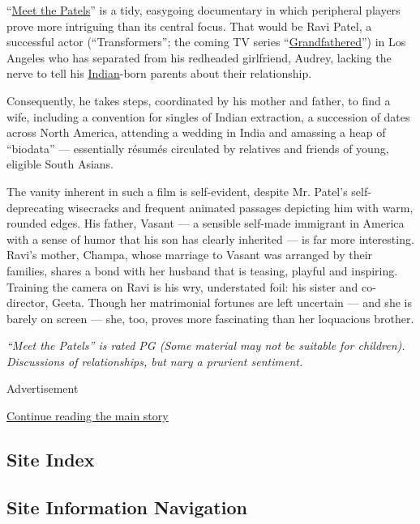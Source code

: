 ``\href{http://www.meetthepatelsfilm.com/}{Meet the Patels}'' is a tidy,
easygoing documentary in which peripheral players prove more intriguing
than its central focus. That would be Ravi Patel, a successful actor
(``Transformers''; the coming TV series
``\href{https://www.youtube.com/watch?v=1V7u8Jdo63A}{Grandfathered}'')
in Los Angeles who has separated from his redheaded girlfriend, Audrey,
lacking the nerve to tell his
\href{http://www.gujaratindia.com/}{Indian}-born parents about their
relationship.

Consequently, he takes steps, coordinated by his mother and father, to
find a wife, including a convention for singles of Indian extraction, a
succession of dates across North America, attending a wedding in India
and amassing a heap of ``biodata'' --- essentially résumés circulated by
relatives and friends of young, eligible South Asians.

The vanity inherent in such a film is self-evident, despite Mr. Patel's
self-deprecating wisecracks and frequent animated passages depicting him
with warm, rounded edges. His father, Vasant --- a sensible self-made
immigrant in America with a sense of humor that his son has clearly
inherited --- is far more interesting. Ravi's mother, Champa, whose
marriage to Vasant was arranged by their families, shares a bond with
her husband that is teasing, playful and inspiring. Training the camera
on Ravi is his wry, understated foil: his sister and co-director, Geeta.
Though her matrimonial fortunes are left uncertain --- and she is barely
on screen --- she, too, proves more fascinating than her loquacious
brother.

\emph{``Meet the Patels'' is rated PG (Some material may not be suitable
for children). Discussions of relationships, but nary a prurient
sentiment.}

Advertisement

\protect\hyperlink{after-bottom}{Continue reading the main story}

\hypertarget{site-index}{%
\subsection{Site Index}\label{site-index}}

\hypertarget{site-information-navigation}{%
\subsection{Site Information
Navigation}\label{site-information-navigation}}

